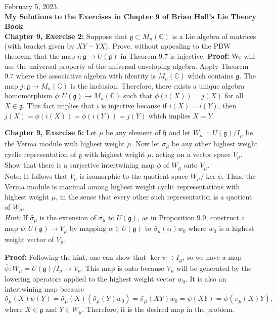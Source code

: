 February 5, 2023.\\

\textbf{My Solutions to the Exercises in Chapter 9 of Brian Hall's Lie 
Theory Book}\\

\textbf{Chapter 9, Exercise 2: }Suppose that $\mathfrak{g} \subset M_n(\mathbb{C})$ is a Lie algebra of matrices (with bracket given by $XY-YX$). Prove, without appealing to the PBW theorem, that the map $i:\mathfrak{g}\to U(\mathfrak{g})$ in Theorem 9.7 is injective.
\textbf{Proof: }
We will use the universal property of the universal enveloping algebra. Apply Theorem 9.7 where the associative algebra with identity is $M_n(\mathbb{C})$ which contains $\mathfrak{g}$. The map $j:\mathfrak{g}\to M_n(\mathbb{C})$ is the inclusion. Therefore, there exists a unique algebra homomorphism $\phi: U(\mathfrak{g}) \to M_n(\mathbb{C})$ such that $\phi(i(X)) = j(X)$ for all $X\in \mathfrak{g}$. This fact implies that $i$ is injective because if $i(X) = i(Y)$, then $j(X) = \phi(i(X)) = \phi(i(Y)) = j(Y)$ which implies $X=Y$.

\textbf{Chapter 9, Exercise 5: } Let $\mu$ be any element of $\mathfrak{h}$ and let $W_\mu = U(\mathfrak{g})/I_\mu$ be the Verma module with
highest weight $\mu$. Now let $\sigma_\mu$ be any other highest weight cyclic representation of $\mathfrak{g}$ with highest weight $\mu$, acting on a vector space $V_\mu$. Show that there is a surjective intertwining map $\phi$ of $W_\mu$ onto $V_\mu$.\\
Note: It follows that $V_\mu$ is isomorphic to the quotient space $W_\mu/\ker \phi$. Thus, the Verma module is maximal among highest weight cyclic representations with highest weight $\mu$, in the sense that every other such representation is a quotient of $W_\mu.$\\
\emph{Hint: } If $\tilde{\sigma_\mu}$ is the extension of $\sigma_\mu$ to $U(\mathfrak{g})$, as in Proposition 9.9, construct a map $\psi: U(\mathfrak{g}) \to V_\mu$ by mapping $\alpha \in U(\mathfrak{g})$ to $\tilde{\sigma_\mu}(\alpha)w_0$ where $w_0$ is a highest weight vector of $V_\mu$.

\textbf{Proof: }
Following the hint, one can show that $\ker \psi \supset I_\mu$, so we have a map $\overline{\psi}:W_\mu = U(\mathfrak{g})/I_\mu \to V_\mu.$ This map is onto because $V_\mu$ will be generated by the lowering operators applied to the highest weight vector $w_0$. It is also an intertwining map because $$\tilde{\sigma_\mu}(X)\overline{\psi}(Y) = \tilde{\sigma_\mu}(X)(\tilde{\sigma_\mu}(Y)w_0) = \tilde{\sigma_\mu}(XY)w_0 = \overline{\psi}(XY) = \bar{\psi}(\pi_\mu(X)Y),$$
where $X\in \mathfrak{g}$ and $Y\in W_\mu$. Therefore, it is the desired map in the problem.